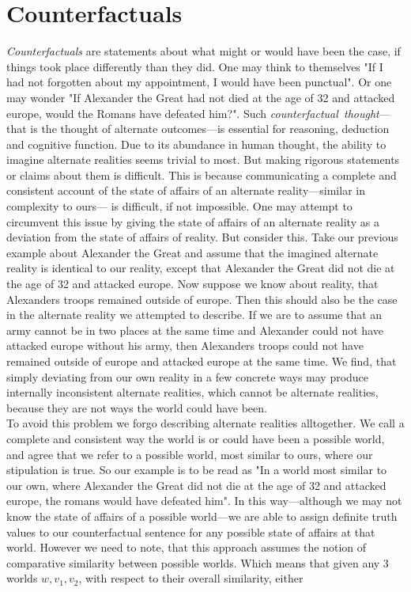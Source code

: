 \documentclass[a4paper,american]{paper}
\theoremstyle{definition}\newtheorem{definition}{Definition}
\begin{document}
\section{Counterfactuals}
\textit{Counterfactuals} are statements about what might or would have been the case, if things took place differently than they did. One may think to themselves "If I had not forgotten about my appointment, I would have been punctual". Or one may wonder "If Alexander the Great had not died at the age of 32 and attacked europe, would the Romans have defeated him?". Such \textit{counterfactual~thought}---that is the thought of alternate outcomes---is essential for reasoning, deduction and cognitive function. \cite{byrne_counterfactual_2016} Due to its abundance in human thought, the ability to imagine alternate realities seems trivial to most. But making rigorous statements or claims about them is difficult. This is because communicating a complete and consistent account of the state of affairs of an alternate reality---similar in complexity to ours--- is difficult, if not impossible. One may attempt to circumvent this issue by giving the state of affairs of an alternate reality as a deviation from the state of affairs of reality. But consider this. 
Take our previous example about Alexander the Great and assume that the imagined alternate reality is identical to our reality, except that Alexander the Great did not die at the age of 32 and attacked europe. Now suppose we know about reality, that Alexanders troops remained outside of europe. Then this should also be the case in the alternate reality we attempted to describe. If we are to assume that an army cannot be in two places at the same time and Alexander could not have attacked europe without his army, then Alexanders troops could not have remained outside of europe and attacked europe at the same time.
We find, that simply deviating from our own reality in a few concrete ways may produce internally inconsistent alternate realities, which cannot be alternate realities, because they are not ways the world could have been.\\
To avoid this problem we forgo describing alternate realities alltogether. We call a complete and consistent way the world is or could have been a possible world, and agree that we refer to a possible world, most similar to ours, where our stipulation is true. So our example is to be read as "In a world most similar to our own, where Alexander the Great did not die at the age of 32 and attacked europe, the romans would have defeated him". In this way---although we may not know the state of affairs of a possible world---we are able to assign definite truth values to our counterfactual sentence for any possible state of affairs at that world. However we need to note, that this approach assumes the notion of comparative similarity between possible worlds. Which means that given any 3 worlds $w,v_1,v_2$, with respect to their overall similarity, either
\end{document}
